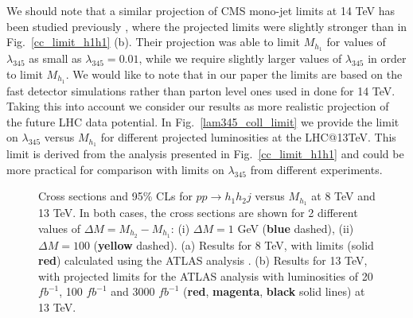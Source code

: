We should note that a similar projection of CMS mono-jet limits \cite{Khachatryan:2014rra} at 14 TeV has been studied previously \cite{Arhrib:2013ela}, where the projected limits were slightly stronger than in Fig.~\ref{cc_limit_h1h1} (b). Their projection was able to limit $M_{h_1}$ for values of $\lambda_{345}$ as small as $\lambda_{345} = 0.01$, while we require slightly larger values of $\lambda_{345}$ in order to limit $M_{h_1}$. 
We would like to note that in our paper the limits are based on the fast detector simulations rather than parton level 
ones used in \cite{Arhrib:2013ela} done for  14 TeV. Taking this into account we consider our results as more realistic
projection of the future LHC data potential.
In Fig.~\ref{lam345_coll_limit} we provide the  limit on $\lambda_{345}$ versus $M_{h_1}$ for different projected luminosities at the LHC@13TeV. This limit is derived from the analysis presented in Fig.~\ref{cc_limit_h1h1} and could be more practical 
for comparison with limits on $\lambda_{345}$ from different experiments.



\begin{figure}[ht]
\centering
\caption{Cross sections and 95\% CLs for $pp \to h_1 h_2 j$ versus $M_{h_1}$ at 8 TeV and 13 TeV. In both cases, the cross sections are shown for 2 different values of $\Delta M = M_{h_2} - M_{h_1}$: (i) $\Delta M = 1$ GeV ({\bf \blue blue} dashed), (ii) $\Delta M = 100$ ({\bf \yellow yellow} dashed). (a) Results for 8 TeV, with limits (solid {\bf \red red}) calculated using the ATLAS analysis \cite{Aad:2015zva}. (b) Results for 13 TeV, with projected limits for the ATLAS analysis \cite{Aad:2015zva} with luminosities of 20 $fb^{-1}$, 100 $fb^{-1}$ and 3000 $fb^{-1}$ ({\bf \red red}, {\bf \magenta magenta}, {\bf black} solid lines) at 13 TeV.} \label{cc_limit_h1h2}
\end{figure}

